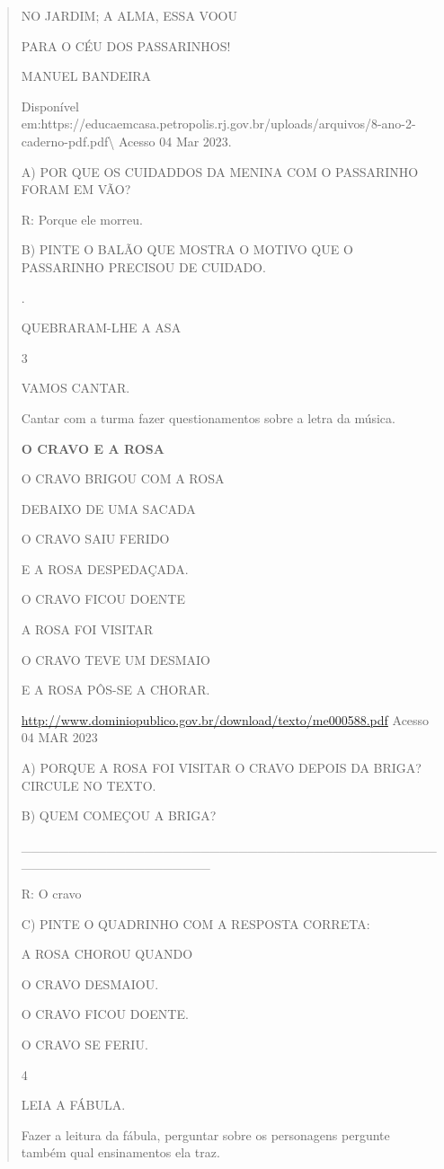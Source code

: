 {{{{\begin{verse}
{{\begin{escolha}
{{{{{NO JARDIM; A ALMA, ESSA \protect\hypertarget{_Hlk128858343}{}{}VOOU

PARA O CÉU DOS PASSARINHOS!

MANUEL BANDEIRA

Disponível
em:https://educaemcasa.petropolis.rj.gov.br/uploads/arquivos/8-ano-2-caderno-pdf.pdf\textbackslash{}
Acesso 04 Mar 2023.

A) POR QUE OS CUIDADDOS DA MENINA COM O PASSARINHO FORAM EM VÃO?

R: Porque ele morreu.

B) PINTE O BALÃO QUE MOSTRA O MOTIVO QUE O PASSARINHO PRECISOU DE
CUIDADO.

.

QUEBRARAM-LHE A ASA

\num{3}

VAMOS CANTAR.

Cantar com a turma fazer questionamentos sobre a letra da música.

\textbf{O CRAVO E A ROSA}

O CRAVO BRIGOU COM A ROSA

DEBAIXO DE UMA SACADA

O CRAVO SAIU FERIDO

E A ROSA DESPEDAÇADA.

\protect\hypertarget{_Hlk128859393}{}{}O CRAVO FICOU DOENTE

A ROSA FOI VISITAR

O CRAVO TEVE UM DESMAIO

E A ROSA PÔS-SE A CHORAR.

\url{http://www.dominiopublico.gov.br/download/texto/me000588.pdf}
Acesso 04 MAR 2023

A) PORQUE A ROSA FOI VISITAR O CRAVO DEPOIS DA BRIGA? CIRCULE NO TEXTO.

B) QUEM COMEÇOU A BRIGA?

\_\_\_\_\_\_\_\_\_\_\_\_\_\_\_\_\_\_\_\_\_\_\_\_\_\_\_\_\_\_\_\_\_\_\_\_\_\_\_\_\_\_\_\_\_\_\_\_\_\_\_\_\_\_\_\_\_\_\_\_\_\_\_\_

R: O cravo

C) PINTE O QUADRINHO COM A RESPOSTA CORRETA:

A ROSA CHOROU QUANDO

O CRAVO DESMAIOU.

O CRAVO FICOU DOENTE.

O CRAVO SE FERIU.

\num{4}

LEIA A FÁBULA.

Fazer a leitura da fábula, perguntar sobre os personagens pergunte
também qual ensinamentos ela traz.

}}}}}
\end{escolha}}}
\end{verse}}}}}
